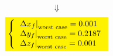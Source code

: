 \documentclass[11pt, a4paper]{article}
\begin{document}
\begin{equation*}
    \Downarrow
\end{equation*}
\begin{equation}
    \colorbox{yellow}{$\left\{\begin{array}{l}
        \displaystyle\left.\Delta x_f\right|_\text{worst case} = 0.001 \\
        \displaystyle\left.\Delta y_f\right|_\text{worst case} = 0.2187 \\ 
        \displaystyle\left.\Delta z_f\right|_\text{worst case} = 0.001
    \end{array}\right.$}
\end{equation}
\end{document}
